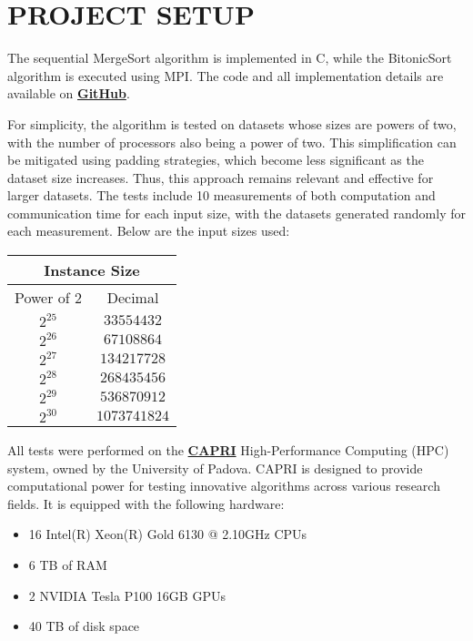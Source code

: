 \documentclass[article,12pt,conference]{ieeeconf} %
\begin{document}

\section{PROJECT SETUP}
The sequential MergeSort algorithm is implemented in C, while the BitonicSort algorithm is executed using MPI. The code and all implementation details are available on \textbf{\href{https://github.com/francesco-biscaccia-carrara/BitonicSort}{GitHub}}. \par
For simplicity, the algorithm is tested on datasets whose sizes are powers of two, with the number of processors also being a power of two. This simplification can be mitigated using padding strategies, which become less significant as the dataset size increases. Thus, this approach remains relevant and effective for larger datasets.
The tests include 10 measurements of both computation and communication time for each input size, with the datasets generated randomly for each measurement. Below are the input sizes used:
\begin{center}
\begin{tabular}{|c||c|}
 \hline
 \multicolumn{2}{|c|}{Instance Size} \\
 \hline
 Power of 2& Decimal\\
 \hline
 $2^{25}$ & $33554432$\\
 $2^{26}$ & $67108864$\\
 $2^{27}$ & $134217728$\\
 $2^{28}$ & $268435456$\\
 $2^{29}$ & $536870912$\\
 $2^{30}$ & $1073741824$\\
 \hline
\end{tabular}
\end{center}
All tests were performed on the \textbf{\href{https://capri.dei.unipd.it}{CAPRI}} High-Performance Computing (HPC) system, owned by the University of Padova. CAPRI is designed to provide computational power for testing innovative algorithms across various research fields. It is equipped with the following hardware:
\begin{itemize}
    \item 16 Intel(R) Xeon(R) Gold 6130 @ 2.10GHz CPUs
    \item 6 TB of RAM
    \item 2 NVIDIA Tesla P100 16GB GPUs
    \item 40 TB of disk space
\end{itemize}
\end{document}
